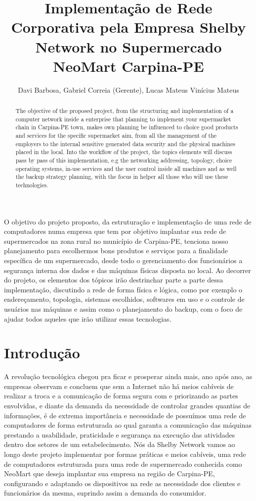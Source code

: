 \documentclass[12pt]{article}
\title{Implementação de Rede Corporativa pela Empresa Shelby Network no Supermercado NeoMart Carpina-PE}
\author{Davi Barbosa\inst{1}, Gabriel Correia (Gerente)\inst{2}, Lucas Mateus\inst{3} Vinícius Mateus\inst{4}}
\begin{document}
 

\maketitle

\begin{abstract}
  The objective of the proposed project, from the structuring and implementation of a computer network inside a enterprise that planning to implement your supermarket chain in Carpina-PE town, makes own planning be influenced to choice good products and services for the specific supermarket aim, from all the management of the employers to the internal sensitive generated data security and the physical machines placed in the local. Into the workflow of the project, the topics elements will discuss pass by pass of this implementation, e.g the networking addressing, topology, choice operating systems, in-use services and the user control inside all machines and as well the backup strategy planning, with the focus in helper all those who will use these technologies.
\end{abstract}
     
\begin{resumo} 
  O objetivo do projeto proposto, da estruturação e implementação de uma rede de computadores numa empresa que tem por objetivo implantar sua rede de supermercados na zona rural no município de Carpina-PE, tenciona nosso planejamento para escolhermos bons produtos e serviços para a finalidade específica de um supermercado, desde todo o gerenciamento dos funcionários a segurança interna dos dados e das máquinas físicas disposta no local. Ao decorrer do projeto, os elementos dos tópicos irão destrinchar parte a parte dessa implementação, discutindo a rede de forma física e lógica, como por exemplo o endereçamento, topologia, sistemas escolhidos, softwares em uso e o controle de usuários nas máquinas e assim como o planejamento do backup, com o foco de ajudar todos aqueles que irão utilizar essas tecnologias.
\end{resumo}

\section{Introdução}
 A revolução tecnológica chegou pra ficar e prosperar ainda mais, ano após ano, as empresas observam e concluem que sem a Internet não há meios cabíveis de realizar a troca e a comunicação de forma segura com e priorizando as partes envolvidas, e diante da demanda da necessidade de controlar grandes quantias de informações, é de extrema importância e necessidade de possuímos uma rede de computadores de forma estruturada ao qual garanta a comunicação das máquinas prestando a usabilidade, praticidade e segurança na execução das atividades dentro dos setores de um estabelecimento. Nós da Shelby Network vamos ao longo deste projeto implementar por formas práticas e meios cabíveis, uma rede de computadores estruturada para uma rede de supermercado conhecida como NeoMart que deseja implantar sua empresa na região de Carpina-PE, configurando e adaptando os dispositivos na rede as necessidade dos clientes e funcionários da mesma, suprindo assim a demanda do consumidor.
\end{document}
